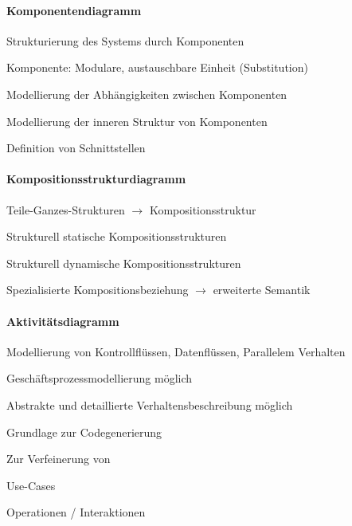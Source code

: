 \documentclass[a4paper]{article}
\begin{document}
\begin{multicols}{3}
  \paragraph{Komponentendiagramm}
  \begin{itemize*}
    \item Strukturierung des Systems durch Komponenten
    \item Komponente: Modulare, austauschbare Einheit (Substitution)
    \item Modellierung der Abhängigkeiten zwischen Komponenten
    \item Modellierung der inneren Struktur von Komponenten
    \item Definition von Schnittstellen
  \end{itemize*}

  \paragraph{Kompositionsstrukturdiagramm}
  \begin{itemize*}
    \item Teile-Ganzes-Strukturen $\rightarrow$ Kompositionsstruktur
    \item Strukturell statische Kompositionsstrukturen
    \item Strukturell dynamische Kompositionsstrukturen
    \item Spezialisierte Kompositionsbeziehung $\rightarrow$ erweiterte Semantik
  \end{itemize*}

  \paragraph{Aktivitätsdiagramm}
  \begin{itemize*}
    \item Modellierung von Kontrollflüssen, Datenflüssen, Parallelem Verhalten
    \item Geschäftsprozessmodellierung möglich
    \item Abstrakte und detaillierte Verhaltensbeschreibung möglich
    \item Grundlage zur Codegenerierung
    \item Zur Verfeinerung von
    \begin{itemize*}
      \item Use-Cases
      \item Operationen / Interaktionen
    \end{itemize*}
  \end{itemize*}


\end{multicols}
\end{document}
